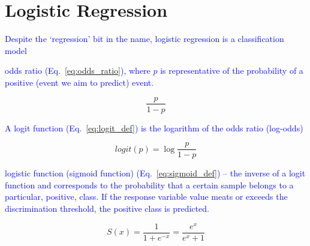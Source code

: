 \section{Logistic Regression}

\textcolor{blue}{Despite the `regression' bit in the name, logistic regression is a classification model}

\textcolor{blue}{odds ratio (Eq.~\ref{eq:odds_ratio}), where $p$ is representative of the probability of a positive (event we aim to predict) event.}

\begin{equation}
{\frac{p}{1-p}}
\label{eq:odds_ratio}
\end{equation}

\textcolor{blue}{A logit function (Eq.~\ref{eq:logit_def}) is the logarithm of the odds ratio (log-odds)}

\begin{equation}
{logit(p)=\log{\frac{p}{1-p}}}
\label{eq:logit_def}
\end{equation}

\textcolor{blue}{logistic function (sigmoid function) (Eq.~\ref{eq:sigmoid_def}) -- the inverse of a logit function and corresponds to the probability that a certain sample belongs to a particular, positive, class. If the response variable value meats or exceeds the {discrimination threshold}, the positive class is predicted.}

\begin{equation}
{S(x)={\frac{1}{1+e^{-x}}}={\frac{e^x}{e^x+1}}}
\label{eq:sigmoid_def}
\end{equation}
